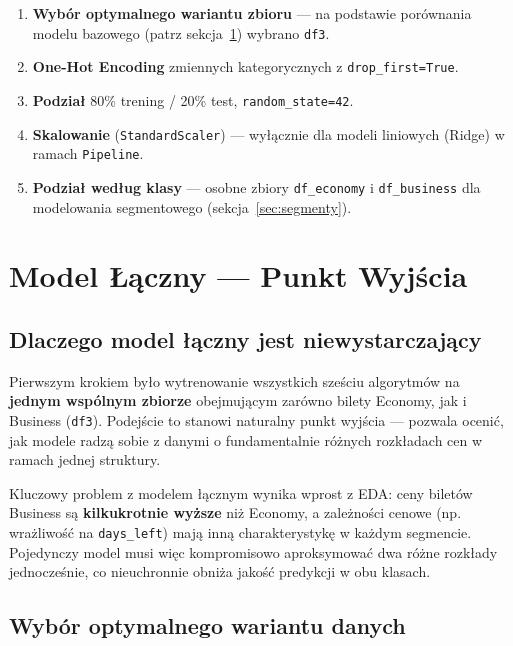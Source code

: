 \documentclass[12pt,a4paper]{article}
\begin{document}
	\begin{enumerate}
		\item \textbf{Wybór optymalnego wariantu zbioru} --- na podstawie porównania
		modelu bazowego (patrz sekcja~\ref{sec:modele}) wybrano \texttt{df3}.
		\item \textbf{One-Hot Encoding} zmiennych kategorycznych z \texttt{drop\_first=True}.
		\item \textbf{Podział} 80\% trening / 20\% test, \texttt{random\_state=42}.
		\item \textbf{Skalowanie} (\texttt{StandardScaler}) --- wyłącznie dla modeli
		liniowych (Ridge) w ramach \texttt{Pipeline}.
		\item \textbf{Podział według klasy} --- osobne zbiory \texttt{df\_economy}
		i \texttt{df\_business} dla modelowania segmentowego (sekcja~\ref{sec:segmenty}).
	\end{enumerate}
	
	
	\section{Model Łączny --- Punkt Wyjścia}
	\label{sec:modele}
	
	\subsection{Dlaczego model łączny jest niewystarczający}
	
	Pierwszym krokiem było wytrenowanie wszystkich sześciu algorytmów na \textbf{jednym
		wspólnym zbiorze} obejmującym zarówno bilety Economy, jak i Business
	(\texttt{df3}). Podejście to stanowi naturalny punkt wyjścia --- pozwala ocenić,
	jak modele radzą sobie z danymi o fundamentalnie różnych rozkładach cen w ramach
	jednej struktury.
	
	Kluczowy problem z modelem łącznym wynika wprost z EDA: ceny biletów Business
	są \textbf{kilkukrotnie wyższe} niż Economy, a zależności cenowe (np. wrażliwość
	na \texttt{days\_left}) mają inną charakterystykę w każdym segmencie. Pojedynczy
	model musi więc kompromisowo aproksymować dwa różne rozkłady jednocześnie,
	co nieuchronnie obniża jakość predykcji w obu klasach.
	
\subsection{Wybór optymalnego wariantu danych}
\end{document}
